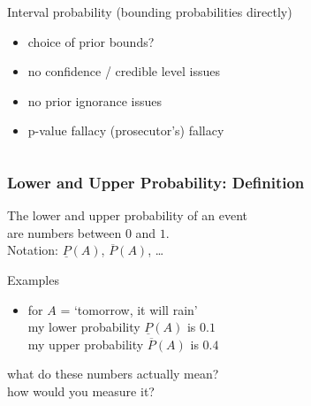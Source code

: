 \documentclass{beamer}
\newcommand{\lpr}{\underline{P}}
\newcommand{\upr}{\overline{P}}
\newcommand{\gplus}{\structure{\textbf{+}}}
\newcommand{\gmins}{\structure{\textbf{--}}}
\begin{document}
\begin{frame}
\begin{columns}
\begin{column}{0.8\textwidth}
  \begin{block}{Interval probability (bounding probabilities directly)}
    \begin{itemize}
  \setlength{\itemsep}{0pt}
  \setlength{\parskip}{0pt}
  \setlength{\parsep}{0pt}
    \item[\gmins] choice of prior bounds?
    \item[\gplus] no confidence / credible level issues
    \item[\gplus] no prior ignorance issues
    \item[\gplus] p-value fallacy (prosecutor's) fallacy
    \end{itemize}
  \end{block}
  \end{column}
  \begin{column}{0.2\textwidth}
  \end{column}
  \end{columns}
\end{frame}

\begin{frame}
  \frametitle{Lower and Upper Probability: Definition}
  \begin{definition}
    The \alert{lower and upper probability of an event}\\ are numbers between $0$ and $1$.
    \\[1ex]
    Notation: $\lpr(A)$, $\upr(A)$, \dots
  \end{definition}
  \begin{exampleblock}{Examples}
    \begin{itemize}
    \item for $A$ = `tomorrow, it will rain' \\
      my lower probability $\lpr(A)$ is $0.1$ \\
      my upper probability $\upr(A)$ is $0.4$
    \end{itemize}
  \end{exampleblock}
  \begin{alertblock}{}
    what do these numbers actually mean? \\
    how would you measure it?
  \end{alertblock}
\end{frame}
\end{document}
